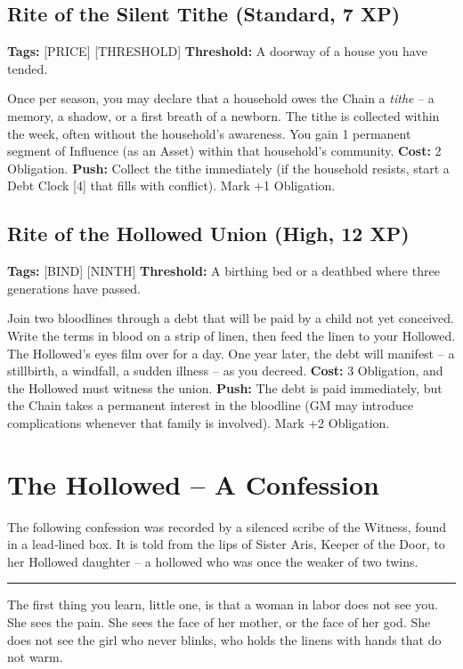 \documentclass[10pt,twoside]{book}
\begin{document}
\section{Rite of the Silent Tithe (Standard, 7 XP)}
\textbf{Tags:} [PRICE] [THRESHOLD] \textbf{Threshold:} A doorway of a house you have tended.

Once per season, you may declare that a household owes the Chain a \textit{tithe} – a memory, a shadow, or a first breath of a newborn. The tithe is collected within the week, often without the household's awareness. You gain 1 permanent segment of Influence (as an Asset) within that household's community. \textbf{Cost:} 2 Obligation. \textbf{Push:} Collect the tithe immediately (if the household resists, start a Debt Clock [4] that fills with conflict). Mark +1 Obligation.

\section{Rite of the Hollowed Union (High, 12 XP)}
\textbf{Tags:} [BIND] [NINTH] \textbf{Threshold:} A birthing bed or a deathbed where three generations have passed.

Join two bloodlines through a debt that will be paid by a child not yet conceived. Write the terms in blood on a strip of linen, then feed the linen to your Hollowed. The Hollowed's eyes film over for a day. One year later, the debt will manifest – a stillbirth, a windfall, a sudden illness – as you decreed. \textbf{Cost:} 3 Obligation, and the Hollowed must witness the union. \textbf{Push:} The debt is paid immediately, but the Chain takes a permanent interest in the bloodline (GM may introduce complications whenever that family is involved). Mark +2 Obligation.

\chapter{The Hollowed – A Confession}

The following confession was recorded by a silenced scribe of the Witness, found in a lead‑lined box. It is told from the lips of Sister Aris, Keeper of the Door, to her Hollowed daughter – a hollowed who was once the weaker of two twins.

\vspace{1em}
\noindent\rule{\textwidth}{0.5pt}
\stoybox

The first thing you learn, little one, is that a woman in labor does not see you. She sees the pain. She sees the face of her mother, or the face of her god. She does not see the girl who never blinks, who holds the linens with hands that do not warm.
\end{document}
